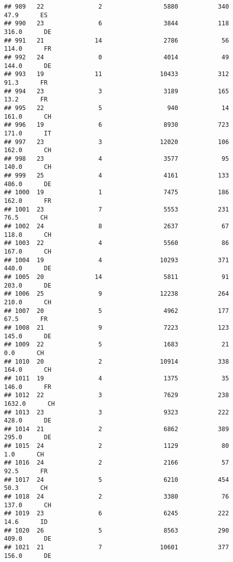 \documentclass[
]{article}
\begin{document}
\begin{verbatim}
## 989   22               2                 5880           340     47.9      ES
## 990   23               6                 3844           118    316.0      DE
## 991   21              14                 2786            56    114.0      FR
## 992   24               0                 4014            49    144.0      DE
## 993   19              11                10433           312     91.3      FR
## 994   23               3                 3189           165     13.2      FR
## 995   22               5                  940            14    161.0      CH
## 996   19               6                 8930           723    171.0      IT
## 997   23               3                12020           106    162.0      CH
## 998   23               4                 3577            95    140.0      CH
## 999   25               4                 4161           133    486.0      DE
## 1000  19               1                 7475           186    162.0      FR
## 1001  23               7                 5553           231     76.5      CH
## 1002  24               8                 2637            67    118.0      CH
## 1003  22               4                 5560            86    167.0      CH
## 1004  19               4                10293           371    440.0      DE
## 1005  20              14                 5811            91    203.0      DE
## 1006  25               9                12238           264    210.0      CH
## 1007  20               5                 4962           177     67.5      FR
## 1008  21               9                 7223           123    145.0      DE
## 1009  22               5                 1683            21      0.0      CH
## 1010  20               2                10914           338    164.0      CH
## 1011  19               4                 1375            35    146.0      FR
## 1012  22               3                 7629           238   1632.0      CH
## 1013  23               3                 9323           222    428.0      DE
## 1014  21               2                 6862           389    295.0      DE
## 1015  24               2                 1129            80      1.0      CH
## 1016  24               2                 2166            57     92.5      FR
## 1017  24               5                 6210           454     50.3      CH
## 1018  24               2                 3380            76    137.0      CH
## 1019  23               6                 6245           222     14.6      ID
## 1020  26               5                 8563           290    409.0      DE
## 1021  21               7                10601           377    156.0      DE

\end{verbatim}
\end{document}

